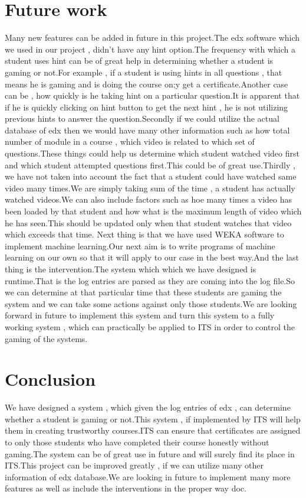 \documentclass[a4paper,12pt,oneside]{sphinxmanual}
\begin{document}
\chapter{Future work}
\label{references:future-work}\label{references::doc}
Many new features can be added in future in this project.The edx software which we used in our project , didn't have any hint option.The frequency with which a student uses hint can be of great help in determining whether a student is gaming or not.For example , if a student is using hints in all questions , that means he is gaming and is doing the course on;y get a certificate.Another case can be , how quickly is he taking hint on a particular question.It is apparent that if he is quickly clicking on hint button to get the next hint , he is not utilizing previous hints to answer the question.Secondly if we could utilize the actual database of edx  then we would have many other information such as how total number of module in  a course , which video is related to which set of questions.These things could help us determine which student watched video first and which student attempted questions first.This could be of great use.Thirdly , we have not taken into account the fact that a student could have watched same video many times.We are simply taking sum of the time , a student has actually watched videos.We can also include factors such as hoe many times a video has been loaded by that student and how what is the maximum length of video which he has seen.This should be updated only when that student watches that video which exceeds that time.
Next thing is that we have used WEKA software to implement machine learning.Our next aim is to write programs of machine learning on our own so that it will apply to our case in the best way.And the last thing is the intervention.The system which which we have designed is runtime.That is the log entries are parsed as they are coming into the log file.So we can determine at that particular time that these students are gaming the system and we can take some actions against only those students.We are looking forward in future to implement this system and turn this system to a fully working system , which can practically be applied to ITS in order to control the gaming of the systems.


\chapter{Conclusion}
\label{references:conclusion}
We have designed a system , which given the log entries of edx , can determine whether a student  is gaming or not.This system , if implemented by ITS will help them in creating trustworthy courses.ITS can ensure that certificates are assigned to only those students who have completed their course honestly without gaming.The system can be of great use in future and will surely find its place in ITS.This project can be improved greatly , if we can utilize many other information of edx database.We are looking in future to implement many more features as well as include the interventions in the proper way doc.
\end{document}
